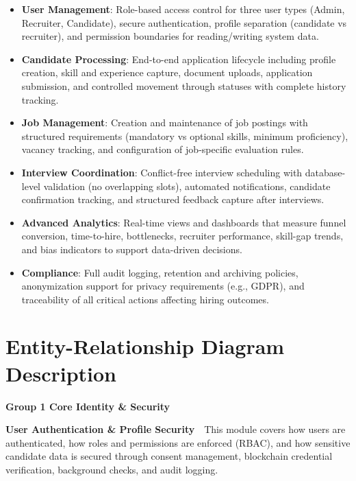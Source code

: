 \documentclass[11pt,a4paper]{article}
\newcommand{\groupdesc}[2]{%
  \begin{mdframed}[
    backgroundcolor=descbg,
    linecolor=descborder,
    linewidth=1.2pt,
    leftline=true, rightline=false, topline=false, bottomline=false,
    innerleftmargin=10pt, innerrightmargin=8pt,
    innertopmargin=5pt, innerbottommargin=5pt,
    skipabove=4pt, skipbelow=6pt
  ]
  \small\textcolor{taglabel}{\textbf{#1}}\ \textbullet\ #2
  \end{mdframed}%
}
\begin{document}
\begin{itemize}
    \item \textbf{User Management}: Role-based access control for three user types (Admin, Recruiter, Candidate), secure authentication, profile separation (candidate vs recruiter), and permission boundaries for reading/writing system data.
    \item \textbf{Candidate Processing}: End-to-end application lifecycle including profile creation, skill and experience capture, document uploads, application submission, and controlled movement through statuses with complete history tracking.
    \item \textbf{Job Management}: Creation and maintenance of job postings with structured requirements (mandatory vs optional skills, minimum proficiency), vacancy tracking, and configuration of job-specific evaluation rules.
    \item \textbf{Interview Coordination}: Conflict-free interview scheduling with database-level validation (no overlapping slots), automated notifications, candidate confirmation tracking, and structured feedback capture after interviews.
    \item \textbf{Advanced Analytics}: Real-time views and dashboards that measure funnel conversion, time-to-hire, bottlenecks, recruiter performance, skill-gap trends, and bias indicators to support data-driven decisions.
    \item \textbf{Compliance}: Full audit logging, retention and archiving policies, anonymization support for privacy requirements (e.g., GDPR), and traceability of all critical actions affecting hiring outcomes.
\end{itemize}


\section{Entity-Relationship Diagram Description}

\begin{center}{\large\bfseries Group 1 \textemdash{} Core Identity \& Security}\end{center}
\vspace{2pt}
\groupdesc{User Authentication \& Profile Security}{This module covers how users are authenticated, how roles and permissions are enforced (RBAC), and how sensitive candidate data is secured through consent management, blockchain credential verification, background checks, and audit logging.}
\end{document}
